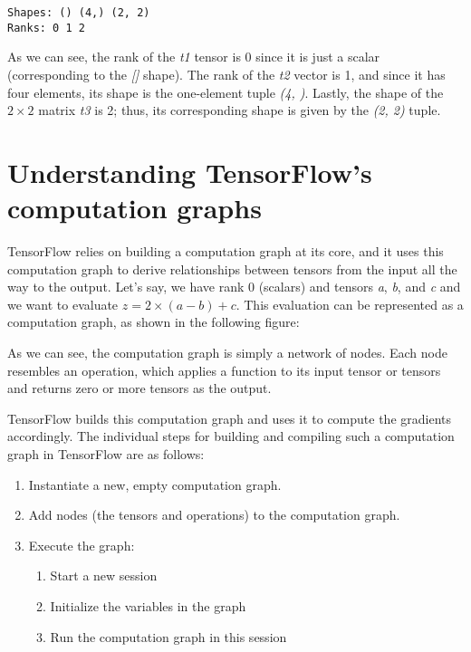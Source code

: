 \documentclass[11pt]{article}
\providecommand{\tightlist}{%
      \setlength{\itemsep}{0pt}\setlength{\parskip}{0pt}}
\begin{document}
    \begin{Verbatim}[commandchars=\\\{\}]
Shapes: () (4,) (2, 2)
Ranks: 0 1 2

    \end{Verbatim}

    As we can see, the rank of the \emph{t1} tensor is 0 since it is just a
scalar (corresponding to the \emph{{[}{]}} shape). The rank of the
\emph{t2} vector is 1, and since it has four elements, its shape is the
one-element tuple \emph{(4, )}. Lastly, the shape of the \(2 \times 2\)
matrix \emph{t3} is 2; thus, its corresponding shape is given by the
\emph{(2, 2)} tuple.

    \section{Understanding TensorFlow's computation
graphs}\label{understanding-tensorflows-computation-graphs}

    TensorFlow relies on building a computation graph at its core, and it
uses this computation graph to derive relationships between tensors from
the input all the way to the output. Let's say, we have rank 0 (scalars)
and tensors \emph{a}, \emph{b}, and \emph{c} and we want to evaluate
\(z = 2 \times (a - b) + c\). This evaluation can be represented as a
computation graph, as shown in the following figure:

    As we can see, the computation graph is simply a network of nodes. Each
node resembles an operation, which applies a function to its input
tensor or tensors and returns zero or more tensors as the output.

TensorFlow builds this computation graph and uses it to compute the
gradients accordingly. The individual steps for building and compiling
such a computation graph in TensorFlow are as follows:

\begin{enumerate}
\def\labelenumi{\arabic{enumi}.}
\tightlist
\item
  Instantiate a new, empty computation graph.
\item
  Add nodes (the tensors and operations) to the computation graph.
\item
  Execute the graph:

  \begin{enumerate}
  \def\labelenumii{\arabic{enumii}.}
  \tightlist
  \item
    Start a new session
  \item
    Initialize the variables in the graph
  \item
    Run the computation graph in this session
  \end{enumerate}
\end{enumerate}
\end{document}
